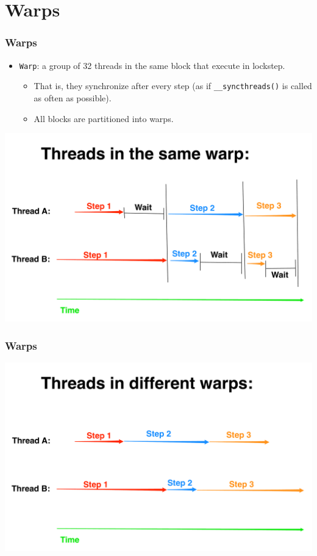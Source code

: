 \documentclass[handout]{beamer}
\numberwithin{equation}{section}
\begin{document}
\section{Warps}

\begin{frame}
\frametitle{Warps}
\begin{itemize}
\item {\tt Warp}: a group of 32 threads in the same block that execute in lockstep.
\begin{itemize}
\pause \item That is, they synchronize after every step (as if {\tt \_\_syncthreads()} is called as often as possible).
\pause \item All blocks are partitioned into warps.
\end{itemize}
\end{itemize}
\pause \begin{center}
\includegraphics[scale=.2]{../../fig/samewarp}
\end{center}
\end{frame}

\begin{frame}
\frametitle{Warps}
 \begin{center}
\includegraphics[scale=.2]{../../fig/diffwarp}
\end{center}
\end{frame}
\end{document}
